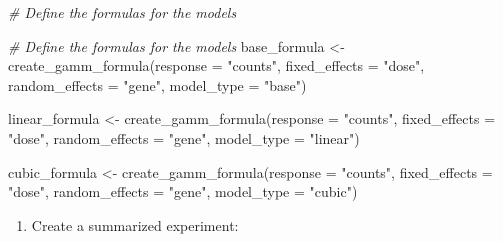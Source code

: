 \documentclass[
]{article}
\newenvironment{Shaded}{\begin{snugshade}}{\end{snugshade}}
\newcommand{\AttributeTok}[1]{\textcolor[rgb]{0.77,0.63,0.00}{#1}}
\newcommand{\CommentTok}[1]{\textcolor[rgb]{0.56,0.35,0.01}{\textit{#1}}}
\newcommand{\FunctionTok}[1]{\textcolor[rgb]{0.00,0.00,0.00}{#1}}
\newcommand{\NormalTok}[1]{#1}
\newcommand{\OtherTok}[1]{\textcolor[rgb]{0.56,0.35,0.01}{#1}}
\newcommand{\StringTok}[1]{\textcolor[rgb]{0.31,0.60,0.02}{#1}}
\providecommand{\tightlist}{%
  \setlength{\itemsep}{0pt}\setlength{\parskip}{0pt}}
\begin{document}
\begin{Shaded}
\begin{Highlighting}[]
\CommentTok{\# Define the formulas for the models}

\CommentTok{\# Define the formulas for the models}
\NormalTok{base\_formula }\OtherTok{\textless{}{-}} \FunctionTok{create\_gamm\_formula}\NormalTok{(}\AttributeTok{response =} \StringTok{"counts"}\NormalTok{,}
                                    \AttributeTok{fixed\_effects =} \StringTok{"dose"}\NormalTok{,}
                                    \AttributeTok{random\_effects =} \StringTok{"gene"}\NormalTok{,}
                                    \AttributeTok{model\_type =} \StringTok{"base"}\NormalTok{)}

\NormalTok{linear\_formula }\OtherTok{\textless{}{-}} \FunctionTok{create\_gamm\_formula}\NormalTok{(}\AttributeTok{response =} \StringTok{"counts"}\NormalTok{,}
                                      \AttributeTok{fixed\_effects =} \StringTok{"dose"}\NormalTok{,}
                                      \AttributeTok{random\_effects =} \StringTok{"gene"}\NormalTok{,}
                                      \AttributeTok{model\_type =} \StringTok{"linear"}\NormalTok{)}

\NormalTok{cubic\_formula }\OtherTok{\textless{}{-}} \FunctionTok{create\_gamm\_formula}\NormalTok{(}\AttributeTok{response =} \StringTok{"counts"}\NormalTok{,}
                                     \AttributeTok{fixed\_effects =} \StringTok{"dose"}\NormalTok{,}
                                     \AttributeTok{random\_effects =} \StringTok{"gene"}\NormalTok{,}
                                     \AttributeTok{model\_type =} \StringTok{"cubic"}\NormalTok{)}
\end{Highlighting}
\end{Shaded}

\begin{enumerate}
\def\labelenumi{\arabic{enumi}.}
\setcounter{enumi}{1}
\tightlist
\item
  Create a summarized experiment:
\end{enumerate}
\end{document}
